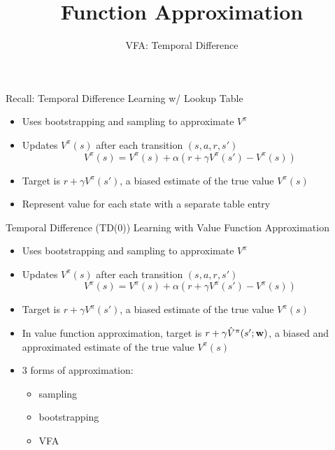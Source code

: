 \documentclass[aspectratio=169]{../latex_main/tntbeamer}  %
\title[RL: Function Approximation]{Function Approximation}
\subtitle{VFA: Temporal Difference}
\begin{document}
	
	\maketitle

\begin{frame}[c]{Recall: Temporal Difference Learning w/ Lookup Table}
	
	\begin{itemize}
		\item Uses bootstrapping and sampling to approximate $V^\pi$
		\item Updates $V^\pi(s)$ after each transition $(s,a,r,s')$
		$$V^\pi(s) = V^\pi (s) + \alpha(r + \gamma V^\pi (s') - V^\pi(s)) $$
		\item Target is $r + \gamma V^\pi(s')$, a biased estimate of the true value $V^\pi(s)$
		\item Represent value for each state with a separate \alert{table entry}
	\end{itemize}

\end{frame}
\begin{frame}[c]{Temporal Difference (TD(0)) Learning with Value
		Function Approximation}
	
	\begin{itemize}
		\item Uses bootstrapping and sampling to approximate $V^\pi$
		\item Updates $V^\pi(s)$ after each transition $(s,a,r,s')$
		$$V^\pi(s) = V^\pi (s) + \alpha(r + \gamma V^\pi (s') - V^\pi(s)) $$
		\item Target is $r + \gamma V^\pi(s')$, a biased estimate of the true value $V^\pi(s)$
		\item In value \alert{function approximation}, target is $r + \gamma \hat{V}^\pi (s'; \mathbf{w})$, a biased and approximated estimate of the true value $V^\pi(s)$
		\item 3 forms of approximation: 
		\begin{itemize}
			\item sampling
			\item bootstrapping
			\item VFA
		\end{itemize}
	\end{itemize}
	
\end{frame}
\end{document}

